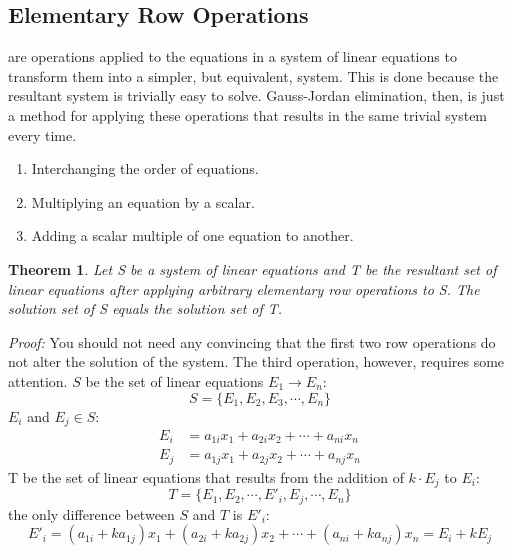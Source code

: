 \documentclass{tufte-book}
\newtheorem{theorem}{Theorem}
\begin{document}
\subsection{Elementary Row Operations}

 are operations applied to the equations in a system of linear equations
to transform them into a simpler, but equivalent, system.
This is done because the resultant system is trivially easy to solve. Gauss-Jordan elimination, then, is just a
method for applying these operations that results in the same trivial system every time.

\begin{enumerate}
	\item Interchanging the order of equations.
	\item Multiplying an equation by a scalar.
	\item Adding a scalar multiple of one equation to another.
\end{enumerate}
\vspace{\baselineskip}
\begin{theorem}
	Let S be a system of linear equations and T be the resultant set of linear equations after applying
	arbitrary elementary row operations to S. The solution set of S equals the solution set of T.
\end{theorem}
\textit{Proof:}
You should not need any convincing that the first two row operations do not alter the solution of the system. The third
operation, however, requires some attention.
 $S$ be the set of linear equations $E_1 \to E_n$:
\begin{equation*}
	S = \{E_1,E_2,E_3,\cdots,E_n\}
\end{equation*}
 $E_i$ and $E_j \in S$:
\begin{align*}
	E_i & = a_{1i}x_1+a_{2i}x_2+\cdots+a_{ni}x_n \\
	E_j & = a_{1j}x_1+a_{2j}x_2+\cdots+a_{nj}x_n
\end{align*}
 T be the set of linear equations that results from the addition of $k \cdot E_j$ to $E_i$:
\begin{equation*}
	T = \{E_1, E_2,\cdots, E'_i, E_j, \cdots, E_n \}
\end{equation*}
 the only difference between $S$ and $T$ is $E'_i$:
\begin{equation*}
	E'_i = (a_{1i}+ka_{1j})x_1+(a_{2i}+ka_{2j})x_2+\cdots+(a_{ni}+ka_{nj})x_n = E_i+kE_j
\end{equation*}
\end{document}
